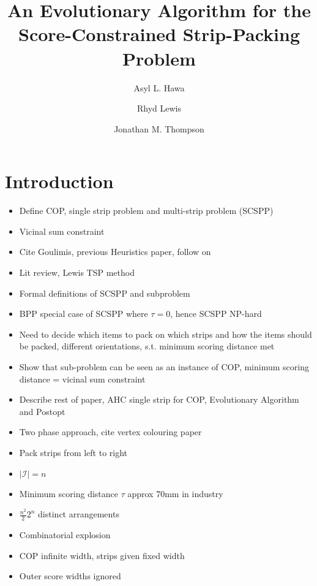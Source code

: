 \documentclass{elsarticle}
\begin{document}
	
\begin{frontmatter}
\title{An Evolutionary Algorithm for the Score-Constrained Strip-Packing Problem}
\author{Asyl L. Hawa}
\author{Rhyd Lewis}
\author{Jonathan M. Thompson}
\address{School of Mathematics, Cardiff University, Senghennydd Road, Cardiff, UK}
\end{frontmatter}


\section{Introduction}
\begin{itemize}
	\item Define COP, single strip problem and multi-strip problem (SCSPP)
	\item Vicinal sum constraint
	\item Cite Goulimis, previous Heuristics paper, follow on
	\item Lit review, Lewis TSP method
	\item Formal definitions of SCSPP and subproblem
	\item BPP special case of SCSPP where $\tau = 0$, hence SCSPP NP-hard
	\item Need to decide which items to pack on which strips and how the items should be packed, different orientations, s.t. minimum scoring distance met
	\item Show that sub-problem can be seen as an instance of COP, minimum scoring distance = vicinal sum constraint
	\item Describe rest of paper, AHC single strip for COP, Evolutionary Algorithm and Postopt
	\item Two phase approach, cite vertex colouring paper
	\item Pack strips from left to right
	\item $|\mathcal{I}| = n$
	\item Minimum scoring distance $\tau$ approx 70mm in industry
	\item $\frac{n^2}{2} 2^n$ distinct arrangements
	\item Combinatorial explosion
	\item COP infinite width, strips given fixed width
	\item Outer score widths ignored
\end{itemize}
\end{document}
